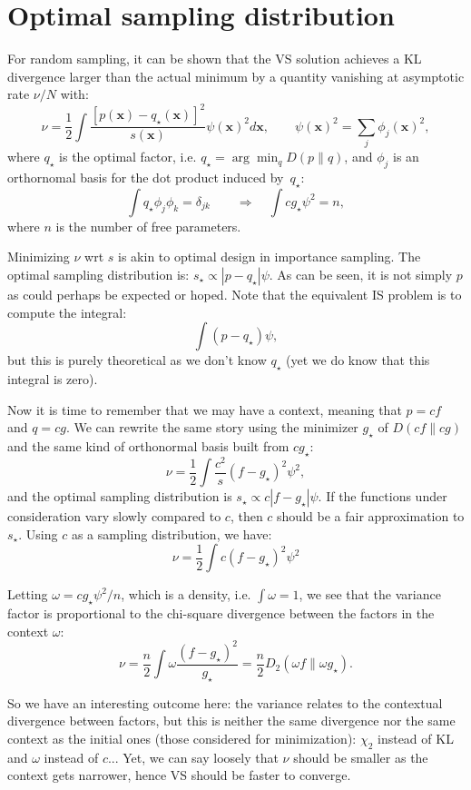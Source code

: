 \documentclass{article}
\def\x{{\mathbf{x}}}
\begin{document}
\appendix

\section{Optimal sampling distribution}
\label{app:opt_sampling}

For random sampling, it can be shown that the VS solution achieves a KL divergence larger than the actual minimum by a quantity vanishing at asymptotic rate $\nu/N$ with:
$$
\nu = \frac{1}{2}\int \frac{[p(\x)-q_\star(\x)]^2}{s(\x)} \psi(\x)^2 d\x,
\qquad 
\psi(\x)^2 = \sum_j \phi_j(\x)^2,
$$
where $q_\star$ is the optimal factor, i.e. $q_\star=\arg\min_q D(p\|q)$, and $\phi_j$ is an orthornomal basis for the dot product induced by~$q_\star$:
$$
\int q_\star \phi_j \phi_k  = \delta_{jk} 
\qquad \Rightarrow \quad
\int cg_\star \psi^2 = n,
$$
where $n$ is the number of free parameters. 

Minimizing $\nu$ wrt $s$ is akin to optimal design in importance sampling. The optimal sampling distribution is: $s_\star \propto |p-q_\star|\psi$. As can be seen, it is not simply $p$ as could perhaps be expected or hoped. Note that the equivalent IS problem is to compute the integral:
$$
\int (p-q_\star)\psi,
$$
but this is purely theoretical as we don't know $q_\star$ (yet we do know that this integral is zero).

Now it is time to remember that we may have a context, meaning that $p=cf$ and $q=cg$. We can rewrite the same story using the minimizer $g_\star$ of $D(cf\|cg)$ and the same kind of orthonormal basis built from $cg_\star$:
$$
\nu = \frac{1}{2}\int \frac{c^2}{s} (f-g_\star)^2 \psi^2,
$$
and the optimal sampling distribution is $s_\star \propto c|f-g_\star|\psi$. If the functions under consideration vary slowly compared to $c$, then $c$ should be a fair approximation to $s_\star$. Using $c$ as a sampling distribution, we have:
$$
\nu = \frac{1}{2}\int c (f-g_\star)^2 \psi^2
$$

Letting $\omega=cg_\star\psi^2/n$, which is a density, i.e. $\int \omega = 1$, we see that the variance factor is proportional to the chi-square divergence between the factors in the context $\omega$: 
$$
\nu 
= \frac{n}{2} \int \omega \frac{(f-g_\star)^2}{g_\star}
= \frac{n}{2} D_2(\omega f\| \omega g_\star)
.
$$

So we have an interesting outcome here: the variance relates to the contextual divergence between factors, but this is neither the same divergence nor the same context as the initial ones (those considered for minimization): $\chi_2$ instead of KL and $\omega$ instead of $c$... Yet, we can say loosely that $\nu$ should be smaller as the context gets narrower, hence VS should be faster to converge.
\end{document}
